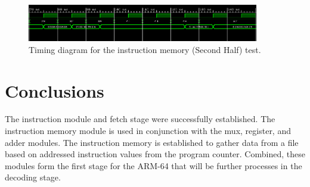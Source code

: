 \documentclass{article}
\begin{document}
\begin{figure}
	\begin{center}
		\caption{Timing diagram for the instruction memory (Second Half) test.}\label{fig:muxtest}
		\includegraphics[width=0.9\textwidth]{../images/instr_memSim2.png}
	\end{center}
\end{figure}

\section{Conclusions}
The instruction module and fetch stage were successfully established.  The instruction memory module is used in conjunction with the mux, register, and adder modules. The instruction memory is established to gather data from a file based on addressed instruction values from the program counter. Combined, these modules form the first stage for the ARM-64 that will be further processes in the decoding stage.
\end{document}
